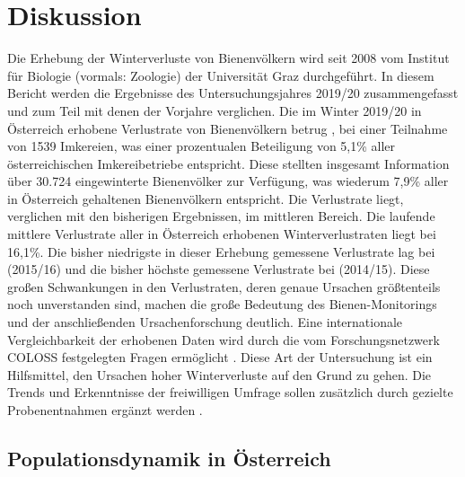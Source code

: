 \section{Diskussion}

Die Erhebung der Winterverluste von Bienenvölkern wird seit 2008 vom Institut für Biologie (vormals: Zoologie) der Universität Graz durchgeführt. In diesem Bericht werden die Ergebnisse des Untersuchungsjahres 2019/20 zusammengefasst und zum Teil mit denen der Vorjahre verglichen. Die im Winter 2019/20 in Österreich erhobene Verlustrate von Bienenvölkern betrug , bei einer Teilnahme von 1539 Imkereien, was einer prozentualen Beteiligung von 5,1\% aller österreichischen Imkereibetriebe entspricht. Diese stellten insgesamt Information über 30.724 eingewinterte Bienenvölker zur Verfügung, was wiederum 7,9\% aller in Österreich gehaltenen Bienenvölkern entspricht. Die Verlustrate liegt, verglichen mit den bisherigen Ergebnissen, im mittleren Bereich. Die laufende mittlere Verlustrate aller in Österreich erhobenen Winterverlustraten liegt bei 16,1\%. Die bisher niedrigste in dieser Erhebung gemessene Verlustrate lag bei  (2015/16) und die bisher höchste gemessene Verlustrate bei  (2014/15). Diese großen Schwankungen in den Verlustraten, deren genaue Ursachen größtenteils noch unverstanden sind, machen die große Bedeutung des Bienen-Monitorings und der anschließenden Ursachenforschung deutlich. Eine internationale Vergleichbarkeit der erhobenen Daten wird durch die vom Forschungsnetzwerk COLOSS festgelegten Fragen ermöglicht \citep{brodschneider2016,brodschneider2018,vanderzee2013}. Diese Art der Untersuchung ist ein Hilfsmittel, den Ursachen hoher Winterverluste auf den Grund zu gehen. Die Trends und Erkenntnisse der freiwilligen Umfrage sollen zusätzlich durch gezielte Probenentnahmen ergänzt werden \citep{vanderzee2015}.

\subsection{Populationsdynamik in Österreich}

